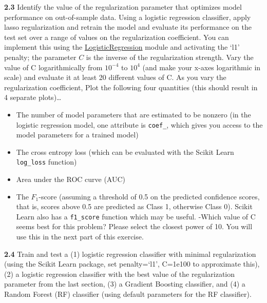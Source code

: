 \documentclass[
  letterpaper,
  DIV=11,
  numbers=noendperiod]{scrartcl}
\providecommand{\tightlist}{%
  \setlength{\itemsep}{0pt}\setlength{\parskip}{0pt}}\usepackage{longtable,booktabs,array}
\begin{document}
\textbf{2.3} Identify the value of the regularization parameter that
optimizes model performance on out-of-sample data. Using a logistic
regression classifier, apply lasso regularization and retrain the model
and evaluate its performance on the test set over a range of values on
the regularization coefficient. You can implement this using the
\href{http://scikit-learn.org/stable/modules/generated/sklearn.linear_model.LogisticRegression.html}{LogisticRegression}
module and activating the `l1' penalty; the parameter \(C\) is the
inverse of the regularization strength. Vary the value of C
logarithmically from \(10^{-4}\) to \(10^4\) (and make your x-axes
logarithmic in scale) and evaluate it at least 20 different values of C.
As you vary the regularization coefficient, Plot the following four
quantities (this should result in 4 separate plots)\ldots{}

\begin{itemize}
\tightlist
\item
  The number of model parameters that are estimated to be nonzero (in
  the logistic regression model, one attribute is \texttt{coef\_}, which
  gives you access to the model parameters for a trained model)
\item
  The cross entropy loss (which can be evaluated with the Scikit Learn
  \texttt{log\_loss} function)
\item
  Area under the ROC curve (AUC)
\item
  The \(F_1\)-score (assuming a threshold of 0.5 on the predicted
  confidence scores, that is, scores above 0.5 are predicted as Class 1,
  otherwise Class 0). Scikit Learn also has a \texttt{f1\_score}
  function which may be useful. -Which value of C seems best for this
  problem? Please select the closest power of 10. You will use this in
  the next part of this exercise.
\end{itemize}

\textbf{2.4} Train and test a (1) logistic regression classifier with
minimal regularization (using the Scikit Learn package, set
penalty=`l1', C=1e100 to approximate this), (2) a logistic regression
classifier with the best value of the regularization parameter from the
last section, (3) a Gradient Boosting classifier, and (4) a Random
Forest (RF) classifier (using default parameters for the RF classifier).
\end{document}
